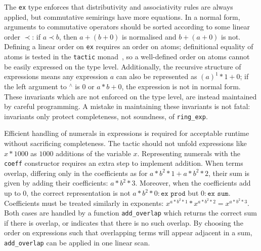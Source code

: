 \documentclass{llncs}
\newcommand{\lean}[1]{\texttt{#1}\xspace} %
\newcommand{\ex}{\lean{ex}}
\newcommand{\pow}{{${}^\wedge$}\xspace}
\newcommand{\ringexp}{\lean{ring\_exp}}
\begin{document}
The \ex type enforces that distributivity and associativity rules are always applied,
but commutative semirings have more equations.
In a normal form, arguments to commutative operators should be sorted according to some linear order $\prec$: if $a \prec b$, then $a + (b + 0)$ is normalised and $b + (a + 0)$ is not.
Defining a linear order on \ex requires an order on atoms; definitional equality of atoms is tested in the \lean{tactic} monad~\cite{lean-tactics},
so a well-defined order on atoms cannot be easily expressed on the type level.
Additionally, the recursive structure of expressions
means any expression $a$ can also be represented as $(a)^1*1 + 0$;
if the left argument to \pow is $0$ or $a * b + 0$, the expression is not in normal form.
These invariants which are not enforced on the type level, are instead maintained by careful programming.
A mistake in maintaining these invariants is not fatal: invariants only protect completeness, not soundness, of \ringexp.

Efficient handling of numerals in expressions is required for acceptable runtime without sacrificing completeness.
The tactic should not unfold expressions like $x * 1000$ as $1000$ additions of the variable $x$.
Representing numerals with the \lean{coeff} constructor requires an extra step to implement addition.
When terms overlap, differing only in the coefficients as for $a * b^2 * 1 + a * b^2 * 2$,
their sum is given by adding their coefficients: $a * b^2 * 3$.
Moreover, when the coefficients add up to $0$, the correct representation is not $a * b^2 * 0 : \lean{ex prod}$ but $0 : \lean{ex sum}$.
Coefficients must be treated similarly in exponents: $x ^ {a * b^2 * 1} * x ^ {a * b^2 * 2} %
= x ^ {a * b^2 * 3}$.
Both cases are handled by a function \lean{add\_overlap} which returns the correct sum if there is overlap,
or indicates that there is no such overlap.
By choosing the order on expressions such that overlapping terms will appear adjacent in a sum,
\lean{add\_overlap} can be applied in one linear scan.
\end{document}
